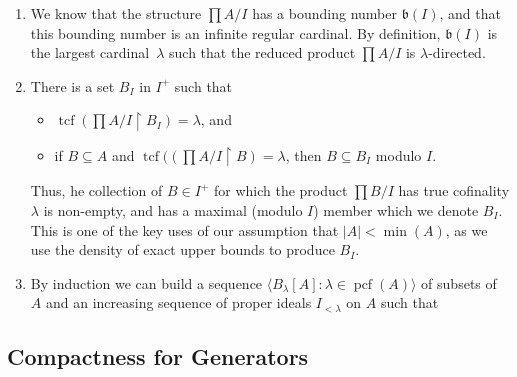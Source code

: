 \documentclass[10pt]{amsart}
\theoremstyle{plain}
\theoremstyle{definition}
\theoremstyle{remark}
\DeclareMathOperator{\tcf}{tcf}
\DeclareMathOperator{\pcf}{pcf}
\newcommand{\sk}{\vskip.05in}
\numberwithin{equation}{section}
\begin{document}
\begin{enumerate}
\item  We know that the structure $\prod A/ I$ has a bounding number $\mathfrak{b}(I)$, and that this bounding number is an infinite regular cardinal.  By definition, $\mathfrak{b}(I)$ is the largest cardinal~$\lambda$ such that the reduced product $\prod A/ I$ is $\lambda$-directed.

\item  There is a set $B_I$ in $I^+$ such that
\begin{itemize}
\item $\tcf\left(\prod A/ I\restriction B_I\right)=\lambda$, and

\item if $B\subseteq A$ and $\tcf(\left(\prod A/ I\restriction B\right)=\lambda$, then $B\subseteq B_I$ modulo $I$.
\end{itemize}
Thus, he collection of $B\in I^+$ for which the product $\prod B/I$ has true cofinality $\lambda$ is non-empty, and has a maximal (modulo $I$) member which we denote $B_I$. This is one of the key uses of our assumption that $|A|<\min(A)$, as we use the density of exact upper bounds to produce $B_I$.

\item  By induction we can build a sequence $\langle B_\lambda[A]:\lambda\in\pcf(A)\rangle$ of subsets of $A$ and an increasing sequence of proper ideals $I_{<\lambda}$ on $A$ such that
\end{enumerate}

\subsection{Compactness for Generators}
\end{document}
